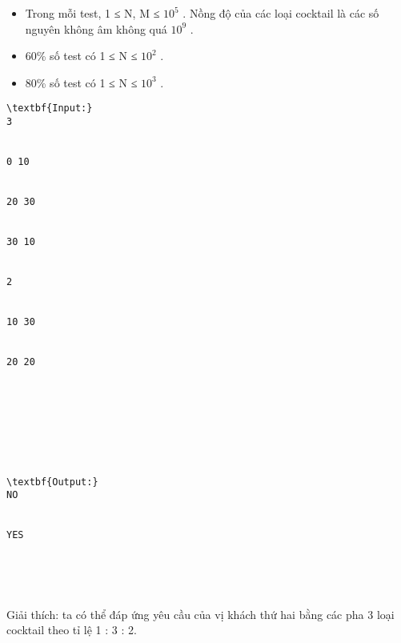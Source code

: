 \begin{itemize}
	\item     Trong mỗi test, 1 ≤ N, M ≤ $10^{5}$    . Nồng độ của các loại cocktail là các số nguyên không âm không quá $10^{9}$    .   
	\item     60\% số test có 1 ≤ N ≤ $10^{2}$    .   
	\item     80\% số test có 1 ≤ N ≤ $10^{3}$    .   
\end{itemize}
\begin{verbatim}
\textbf{Input:}
3


0 10


20 30 


30 10


2


10 30


20 20








\textbf{Output:}
NO


YES





\end{verbatim}

Giải thích: ta có thể đáp ứng yêu cầu của vị khách thứ hai bằng các pha 3 loại cocktail theo tỉ lệ 1 : 3 : 2.